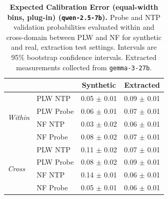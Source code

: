 \begin{table}[ht]
\centering
\begin{tabular}{ll cc}
\toprule
& & Synthetic & Extracted \\
\midrule
\multirow{4}{*}{\textit{Within}}
& PLW NTP & 0.05 $\pm$ 0.01 & 0.09 $\pm$ 0.01 \\
& PLW Probe & 0.06 $\pm$ 0.01 & 0.07 $\pm$ 0.01 \\
& NF NTP & 0.03 $\pm$ 0.02 & 0.06 $\pm$ 0.01 \\
& NF Probe & 0.08 $\pm$ 0.02 & 0.07 $\pm$ 0.01 \\
\midrule
\multirow{4}{*}{\textit{Cross}}
& PLW NTP & 0.11 $\pm$ 0.02 & 0.07 $\pm$ 0.01 \\
& PLW Probe & 0.08 $\pm$ 0.02 & 0.09 $\pm$ 0.01 \\
& NF NTP & 0.14 $\pm$ 0.01 & 0.06 $\pm$ 0.01 \\
& NF Probe & 0.05 $\pm$ 0.01 & 0.06 $\pm$ 0.01 \\
\bottomrule
\end{tabular}
\caption{\textbf{Expected Calibration Error (equal-width bins, plug-in) (\texttt{qwen-2.5-7b}).} Probe and NTP validation probabilities evaluated within and cross-domain between PLW and NF for synthetic and real, extraction test settings. Intervals are 95\% bootstrap confidence intervals. Extracted measurements collected from \texttt{gemma-3-27b}.}
\label{tab:qwen-2.5-7b-gemma-3-27b-pond_nfix-ece}
\end{table}
